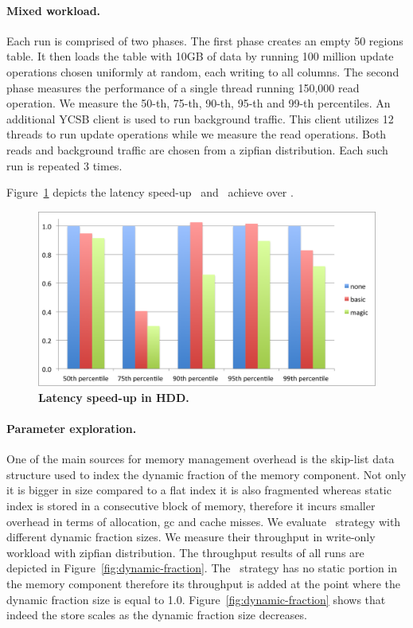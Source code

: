 \paragraph{Mixed workload.}
Each run is comprised of two phases. 
The first phase creates an empty 50 regions table. It then loads the table with 10GB of data by running 100 million update operations chosen uniformly at random, each writing to all columns. 
The second phase measures the performance of a single thread running 150,000 read operation. 
We measure the 50-th, 75-th, 90-th, 95-th and 99-th percentiles.
An additional YCSB client is used to run background traffic. 
This client utilizes 12 threads to run update operations while we measure the read operations. 
Both reads and background traffic are chosen from a zipfian distribution.
Each such run is repeated 3 times. 

Figure~\ref{fig:latency-speedup-hdd} depicts the latency speed-up \basic\ and \magic\ achieve over \none.

\begin{figure}[htb]
\includegraphics[width=\figw]{Figs/latency-speedup-hdd.png}
\caption{{\bf Latency speed-up in HDD.} 
}
\label{fig:latency-speedup-hdd}
\end{figure}

\paragraph{Parameter exploration.}
One of the main sources for memory management overhead is the skip-list data structure used to index the dynamic fraction of the memory component.
Not only it is bigger in size compared to a flat index it is also fragmented whereas static index is stored in a consecutive block of memory, therefore it incurs smaller overhead in terms of allocation, gc and cache misses.
We evaluate \basic\ strategy with different dynamic fraction sizes. We measure their throughput in write-only workload with zipfian distribution.
The throughput results of all runs are depicted in  Figure~\ref{fig:dynamic-fraction}. 
The \none\ strategy has no static portion in the memory component therefore its throughput is added at the point where the dynamic fraction size is equal to 1.0.
Figure~\ref{fig:dynamic-fraction} shows that indeed the store scales as the dynamic fraction size decreases. 

